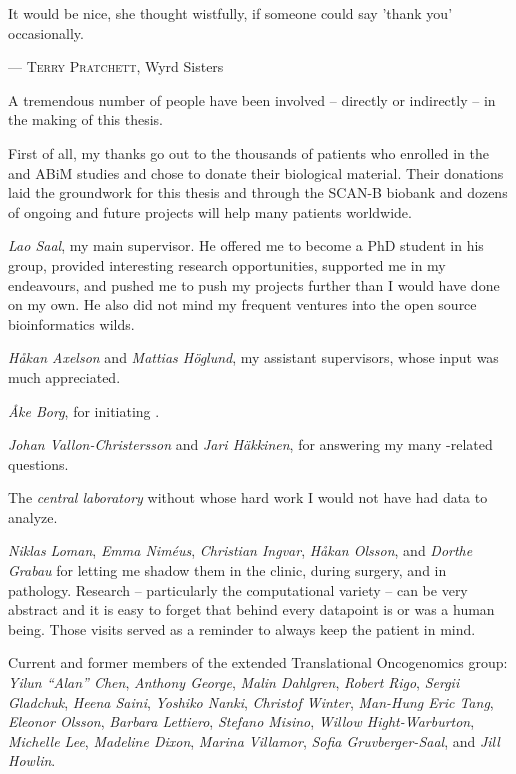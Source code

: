 
\epigraph{It would be nice, she thought wistfully, if someone could say 'thank you' occasionally.}{--- \textsc{Terry Pratchett}\small\textnormal{, Wyrd Sisters}}

A tremendous number of people have been involved -- directly or indirectly -- in the making of this thesis.

First of all, my thanks go out to the thousands of patients who enrolled in the \scanb{} and ABiM studies and chose to donate their biological material. Their donations laid the groundwork for this thesis and through the SCAN-B biobank and dozens of ongoing and future projects will help many patients worldwide.

\textit{Lao Saal}, my main supervisor. He offered me to become a PhD student in his group, provided interesting research opportunities, supported me in my endeavours, and pushed me to push my projects further than I would have done on my own. He also did not mind my frequent ventures into the open source bioinformatics wilds.

\textit{Håkan Axelson} and \textit{Mattias Höglund}, my assistant supervisors, whose input was much appreciated.

\textit{Åke Borg}, for initiating \scanb{}.

\textit{Johan Vallon-Christersson} and \textit{Jari Häkkinen}, for answering my many \scanb{}-related questions.

The \textit{\scanb{} central laboratory} without whose hard work I would not have had data to analyze.

\textit{Niklas Loman}, \textit{Emma Niméus}, \textit{Christian Ingvar}, \textit{Håkan Olsson}, and \textit{Dorthe Grabau} for letting me shadow them in the clinic, during surgery, and in pathology. Research -- particularly the computational variety -- can be very abstract and it is easy to forget that behind every datapoint is or was a human being. Those visits served as a reminder to always keep the patient in mind.

Current and former members of the extended Translational Oncogenomics group: \textit{Yilun ``Alan'' Chen}, \textit{Anthony George}, \textit{Malin Dahlgren}, \textit{Robert Rigo}, \textit{Sergii Gladchuk}, \textit{Heena Saini}, \textit{Yoshiko Nanki}, \textit{Christof Winter}, \textit{Man-Hung Eric Tang}, \textit{Eleonor Olsson}, \textit{Barbara Lettiero}, \textit{Stefano Misino}, \textit{Willow Hight-Warburton}, \textit{Michelle Lee}, \textit{Madeline Dixon}, \textit{Marina Villamor}, \textit{Sofia Gruvberger-Saal}, and \textit{Jill Howlin}.

